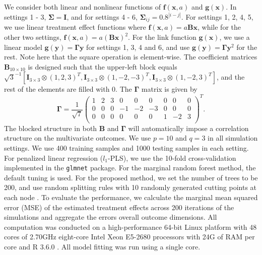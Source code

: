 \documentclass[smallextended]{svjour3}
\begin{document}
We consider both linear and nonlinear functions of $\bm f(\textbf{x}, a)$ and $\bm g(\textbf{x})$. In settings 1 - 3, $\bm \Sigma = \bm I$, and for settings 4 - 6, $\bm \Sigma_{ij} = 0.8^{|i-j|}$. For settings 1, 2, 4, 5, we use linear treatment effect functions where $\bm f(\textbf{x}, a) = a\textbf{B}\textbf{x}$, while for the other two settings, $\bm f(\textbf{x}, a) = a(\textbf{B}\textbf{x})^2$. For the link function $\bm g(\textbf{x})$, we use a linear model $\bm g(\textbf{y}) = \bm \Gamma\textbf{y}$ for settings 1, 3, 4 and 6, and use $\bm g(\textbf{y}) = \bm \Gamma\textbf{y}^2$ for the rest. Note here that the square operation is element-wise. The coefficient matrices $\bm{B}_{10 \times 10}$ is designed such that the upper-left block equals $\sqrt{3}^{-1} [ \mathbf{I}_{3 \times 3}  \otimes (1,2,3)^T, \mathbf{I}_{3 \times 3} \otimes (1,-2,-3)^T, \mathbf{I}_{3 \times 3} \otimes (1,-2,3)^T ]$, and the rest of the elements are filled with 0. The $\bm \Gamma$ matrix is given by 
$$
  \bm \Gamma = \frac{1}{\sqrt{7}}
  \begin{pmatrix}{}
  1 & 2 & 3 & 0 & 0 & 0 & 0 & 0 & 0 \\
  0 & 0 & 0 & -1 & -2 & -3 & 0 & 0 & 0 \\
  0 & 0 & 0 & 0 & 0 & 0 & 1 & -2 & 3 \\
  \end{pmatrix}^T.
$$
The blocked structure in both $\bm B$ and $\bm \Gamma$ will automatically impose a correlation structure on the multivariate outcomes. We use $p=10$ and $q = 3$ in all simulation settings. We use 400 training samples and 1000 testing samples in each setting. For penalized linear regression ($l_1$-PLS), we use the 10-fold cross-validation implemented in the \texttt{glmnet} package. For the marginal random forest method, the default tuning is used. For the proposed method, we set the number of trees to be 200, and use random splitting rules with 10 randomly generated cutting points at each node \citep{geurts2006extremely}. To evaluate the performance, we calculate the marginal mean squared error (MSE) of the estimated treatment effects across 200 iterations of the simulations and aggregate the errors overall outcome dimensions. All computation was conducted on a high-performance 64-bit Linux platform with 48 cores of 2.70GHz eight-core Intel Xeon E5-2680 processors with 24G of RAM per core and R 3.6.0 \citep{R2020}. All model fitting was run using a single core.
\end{document}
